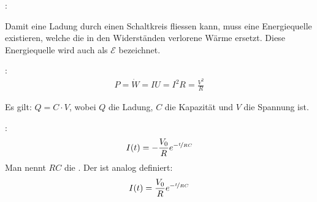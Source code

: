 :

Damit eine Ladung durch einen Schaltkreis fliessen kann, muss eine Energiequelle existieren,
welche die in den Widerständen verlorene Wärme ersetzt. Diese Energiequelle wird auch als
 $\mathcal{E}$ bezeichnet.

\pagebreak

:
\begin{align*}
    P = \dot{W} = I U = I^2 R = \frac{V^2}{R}
\end{align*}

\vspace{1\baselineskip}


Es gilt: $Q = C \cdot V$, wobei $Q$ die Ladung, $C$ die Kapazität und $V$ die Spannung ist.

\vspace{1\baselineskip}

:
\begin{align*}
    I(t) = - \frac{V_0}{R} e^{-\nicefrac{t}{R C}}
\end{align*}
Man nennt $R C$ die .
Der  ist analog definiert:
\begin{align*}
    I(t) = \frac{V_0}{R} e^{-\nicefrac{t}{R C}}
\end{align*}

\vspace{1\baselineskip}


\vspace{1\baselineskip}


